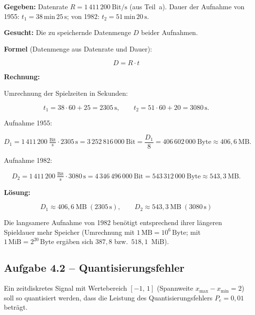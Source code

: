 \begin{beispiel}

\textbf{Gegeben:} Datenrate $R = 1\,411\,200\ \text{Bit/s}$ (aus Teil~a).
Dauer der Aufnahme von 1955: $t_1 = 38\,\text{min}\,25\,\text{s}$; von 1982:
$t_2 = 51\,\text{min}\,20\,\text{s}$.

\textbf{Gesucht:} Die zu speichernde Datenmenge $D$ beider Aufnahmen.

\textbf{Formel} (Datenmenge aus Datenrate und Dauer):

$$
D = R \cdot t
$$

\textbf{Rechnung:}

Umrechnung der Spielzeiten in Sekunden:

$$
t_1 = 38 \cdot 60 + 25 = 2305\,\text{s}, \qquad
t_2 = 51 \cdot 60 + 20 = 3080\,\text{s}.
$$

Aufnahme 1955:

$$
D_1 = 1\,411\,200\ \tfrac{\text{Bit}}{\text{s}} \cdot 2305\,\text{s}
    = 3\,252\,816\,000\ \text{Bit}
    = \frac{D_1}{8} = 406\,602\,000\ \text{Byte} \approx 406{,}6\ \text{MB}.
$$

Aufnahme 1982:

$$
D_2 = 1\,411\,200\ \tfrac{\text{Bit}}{\text{s}} \cdot 3080\,\text{s}
    = 4\,346\,496\,000\ \text{Bit}
    = 543\,312\,000\ \text{Byte} \approx 543{,}3\ \text{MB}.
$$

\textbf{Lösung:}

$$
\boxed{\;D_1 \approx 406{,}6\ \text{MB} \; (2305\,\text{s}), \qquad
D_2 \approx 543{,}3\ \text{MB} \; (3080\,\text{s})\;}
$$

Die langsamere Aufnahme von 1982 benötigt entsprechend ihrer längeren Spieldauer
mehr Speicher (Umrechnung mit $1\,\text{MB} = 10^6\,\text{Byte}$; mit
$1\,\text{MiB} = 2^{20}\,\text{Byte}$ ergäben sich $387{,}8$ bzw.\ $518{,}1$~MiB).

\end{beispiel}


\subsection*{Aufgabe 4.2 – Quantisierungsfehler}

Ein zeitdiskretes Signal mit Wertebereich $[-1,\,1]$ (Spannweite
$x_{\max} - x_{\min} = 2$) soll so quantisiert werden, dass die Leistung des
Quantisierungsfehlers $P_e = 0{,}01$ beträgt.

